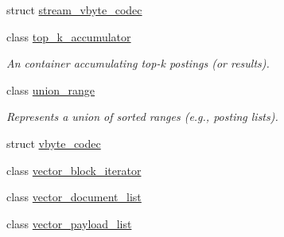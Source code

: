 \begin{DoxyCompactItemize}
struct \mbox{\hyperlink{structirk_1_1stream__vbyte__codec}{stream\+\_\+vbyte\+\_\+codec}}
\item 
class \mbox{\hyperlink{classirk_1_1top__k__accumulator}{top\+\_\+k\+\_\+accumulator}}
\begin{DoxyCompactList}\small\item\em An container accumulating top-\/k postings (or results). \end{DoxyCompactList}\item 
class \mbox{\hyperlink{classirk_1_1union__range}{union\+\_\+range}}
\begin{DoxyCompactList}\small\item\em Represents a union of sorted ranges (e.\+g., posting lists). \end{DoxyCompactList}\item 
struct \mbox{\hyperlink{structirk_1_1vbyte__codec}{vbyte\+\_\+codec}}
\item 
class \mbox{\hyperlink{classirk_1_1vector__block__iterator}{vector\+\_\+block\+\_\+iterator}}
\item 
class \mbox{\hyperlink{classirk_1_1vector__document__list}{vector\+\_\+document\+\_\+list}}
\item 
class \mbox{\hyperlink{classirk_1_1vector__payload__list}{vector\+\_\+payload\+\_\+list}}
\end{DoxyCompactItemize}
